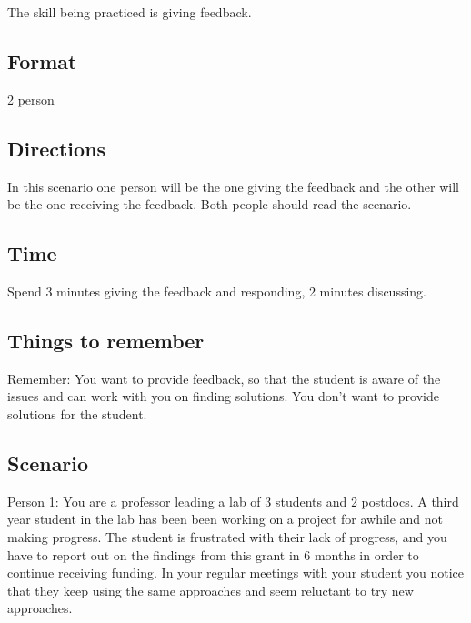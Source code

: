 \documentclass[
  letterpaper,
  DIV=11,
  numbers=noendperiod]{scrreprt}
\begin{document}
The skill being practiced is giving feedback.

\hypertarget{format-1}{%
\subsection*{Format}\label{format-1}}

2 person

\hypertarget{directions-1}{%
\subsection*{Directions}\label{directions-1}}

In this scenario one person will be the one giving the feedback and the
other will be the one receiving the feedback. Both people should read
the scenario.

\hypertarget{time-1}{%
\subsection*{Time}\label{time-1}}

Spend 3 minutes giving the feedback and responding, 2 minutes
discussing.

\hypertarget{things-to-remember-1}{%
\subsection*{Things to remember}\label{things-to-remember-1}}

Remember: You want to provide feedback, so that the student is aware of
the issues and can work with you on finding solutions. You don't want to
provide solutions for the student.

\hypertarget{scenario-1}{%
\subsection*{Scenario}\label{scenario-1}}

Person 1: You are a professor leading a lab of 3 students and 2
postdocs. A third year student in the lab has been been working on a
project for awhile and not making progress. The student is frustrated
with their lack of progress, and you have to report out on the findings
from this grant in 6 months in order to continue receiving funding. In
your regular meetings with your student you notice that they keep using
the same approaches and seem reluctant to try new approaches.
\end{document}
